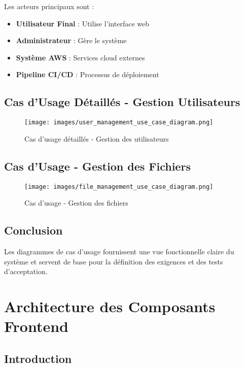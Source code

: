 Les acteurs principaux sont :
\begin{itemize}
    \item \textbf{Utilisateur Final} : Utilise l'interface web
    \item \textbf{Administrateur} : Gère le système
    \item \textbf{Système AWS} : Services cloud externes
    \item \textbf{Pipeline CI/CD} : Processus de déploiement
\end{itemize}

\subsection{Cas d'Usage Détaillés - Gestion Utilisateurs}

\begin{figure}[H]
    \centering
    \texttt{[image: images/user\_management\_use\_case\_diagram.png]}
    \caption{Cas d'usage détaillés - Gestion des utilisateurs}
    \label{fig:user_management_use_case}
\end{figure}

\subsection{Cas d'Usage - Gestion des Fichiers}

\begin{figure}[H]
    \centering
    \texttt{[image: images/file\_management\_use\_case\_diagram.png]}
    \caption{Cas d'usage - Gestion des fichiers}
    \label{fig:file_management_use_case}
\end{figure}

\subsection{Conclusion}

Les diagrammes de cas d'usage fournissent une vue fonctionnelle claire du système et servent de base pour la définition des exigences et des tests d'acceptation.

\section{Architecture des Composants Frontend}

\subsection{Introduction}

